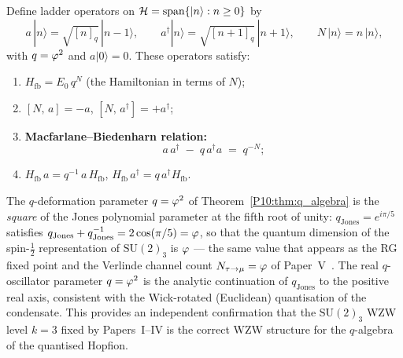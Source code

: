 \begin{theorem}
\label{P10:thm:q_algebra}
Define ladder operators on $\mathcal{H} = \mathrm{span}\{|n\rangle : n\geq0\}$ by
\begin{equation}
  a\,|n\rangle = \sqrt{[n]_q}\,|n-1\rangle,
  \qquad
  a^\dagger|n\rangle = \sqrt{[n+1]_q}\,|n+1\rangle,
  \qquad
  N\,|n\rangle = n\,|n\rangle,
  \label{P10:eq:ladder_def}
\end{equation}
with $q = \varphi^2$ and $a|0\rangle = 0$.
These operators satisfy:
\begin{enumerate}[label=(\roman*),noitemsep]
\item $H_\mathrm{fb} = E_0\,q^N$ \quad (the Hamiltonian in terms of $N$);
\item $[N,\,a] = -a$, \quad $[N,\,a^\dagger] = +a^\dagger$;
\item \textbf{Macfarlane--Biedenharn relation:}
  \begin{equation}
    \boxed{a\,a^\dagger \;-\; q\,a^\dagger a
    \;=\; q^{-N}};
    \label{P10:eq:qosc}
  \end{equation}
\item $H_\mathrm{fb}\,a = q^{-1}\,a\,H_\mathrm{fb}$,
  \quad $H_\mathrm{fb}\,a^\dagger = q\,a^\dagger H_\mathrm{fb}$.
\end{enumerate}
\end{theorem}

\begin{remark}
\label{P10:rem:jones}
The $q$-deformation parameter $q = \varphi^2$ of Theorem~\ref{P10:thm:q_algebra}
is the \emph{square} of the Jones polynomial parameter at the fifth root
of unity: $q_\mathrm{Jones} = e^{i\pi/5}$ satisfies
$q_\mathrm{Jones} + q_\mathrm{Jones}^{-1} = 2\cos(\pi/5) = \varphi$,
so that the quantum dimension of the spin-$\tfrac{1}{2}$ representation
of $\mathrm{SU}(2)_3$ is $\varphi$ --- the same value that appears as the
RG fixed point and the Verlinde channel count $N_{\tau\to\mu} = \varphi$
of Paper~V~\cite{Paper5}.
The real $q$-oscillator parameter $q = \varphi^2$ is the analytic continuation
of $q_\mathrm{Jones}$ to the positive real axis, consistent with the
Wick-rotated (Euclidean) quantisation of the condensate.
This provides an independent confirmation that the $\mathrm{SU}(2)_3$ WZW
level $k=3$ fixed by Papers~I--IV is the correct WZW structure for the
$q$-algebra of the quantised Hopfion.
\end{remark}

